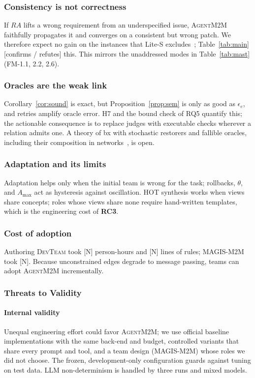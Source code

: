 \documentclass[10pt, anonymous, conference]{IEEEtran}
\theoremstyle{definition}
\theoremstyle{plain}
\theoremstyle{remark}
\newcommand{\tool}{\textsc{AgentM2M}}
\newcommand{\devteam}{\textsc{DevTeam}}
\newcommand{\RC}[1]{\textbf{RC#1}}
\newcommand{\fixme}[1]{{\color{red}[#1]}}
\newcommand{\hyp}[1]{{\color{blue}#1}}           %
\begin{document}
\subsubsection{Consistency is not correctness}
If $\mathit{RA}$ lifts a wrong requirement from an underspecified issue,
\tool{} faithfully propagates it and converges on a consistent but wrong patch.
We therefore expect no gain on the instances that Lite-S
excludes~\cite{xia2025agentless}; \hyp{Table~\ref{tab:main} [confirms /
refutes] this}. This mirrors the unaddressed modes in Table~\ref{tab:mast}
(FM-1.1, 2.2, 2.6).

\subsubsection{Oracles are the weak link}
Corollary~\ref{cor:sound} is exact, but Proposition~\ref{prop:sem} is only as
good as $\epsilon_e$, and retries amplify oracle error. H7 and the bound check
of RQ5 quantify this; the actionable consequence is to replace judges with
executable checks wherever a relation admits one. A theory of bx with
stochastic restorers and fallible oracles, including their composition in
networks~\cite{stevens2020networks,klare2023termination}, is open.

\subsubsection{Adaptation and its limits}
Adaptation helps only when the initial team is wrong for the task; rollbacks,
$\theta$, and $A_{\max}$ act as hysteresis against oscillation. HOT synthesis
works when views share concepts; roles whose views share none require
hand-written templates, which is the engineering cost of \RC{3}.

\subsubsection{Cost of adoption}
Authoring \devteam{} took \fixme{N} person-hours and \fixme{N} lines of rules;
\textsc{MAGIS-M2M} took \fixme{N}. Because unconstrained edges degrade to
message passing, teams can adopt \tool{} incrementally.

\subsubsection{Threats to Validity}

\paragraph{Internal validity}
Unequal engineering effort could favor \tool{}; we use official baseline
implementations with the same back-end and budget, controlled variants that
share every prompt and tool, and a team design (\textsc{MAGIS-M2M}) whose roles
we did not choose. The frozen, development-only configuration guards against
tuning on test data. LLM non-determinism is handled by three runs and mixed
models.
\end{document}

